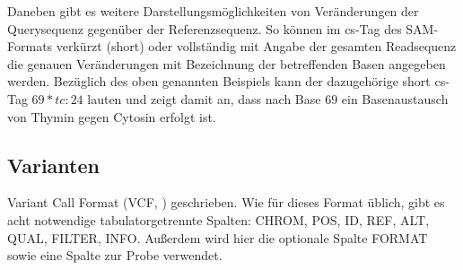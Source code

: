 Daneben gibt es weitere Darstellungsmöglichkeiten von Veränderungen der Querysequenz gegenüber der Referenzsequenz. So können im cs-Tag des SAM-Formats verkürzt (short) oder vollständig mit Angabe der gesamten Readsequenz die genauen Veränderungen mit Bezeichnung der betreffenden Basen angegeben werden. Bezüglich des oben genannten Beispiels kann der dazugehörige short cs-Tag $ 69*tc:24 $ lauten und zeigt damit an, dass nach Base $69$ ein Basenaustausch von Thymin gegen Cytosin erfolgt ist.

\subsection{Varianten} \label{subsec:vcformat}
Variant Call Format (VCF, \cite{danecek_2011}) geschrieben. Wie für dieses Format üblich, gibt es acht notwendige tabulatorgetrennte Spalten: CHROM, POS, ID, REF, ALT, QUAL, FILTER, INFO. Außerdem wird hier die optionale Spalte FORMAT sowie eine Spalte zur Probe verwendet.